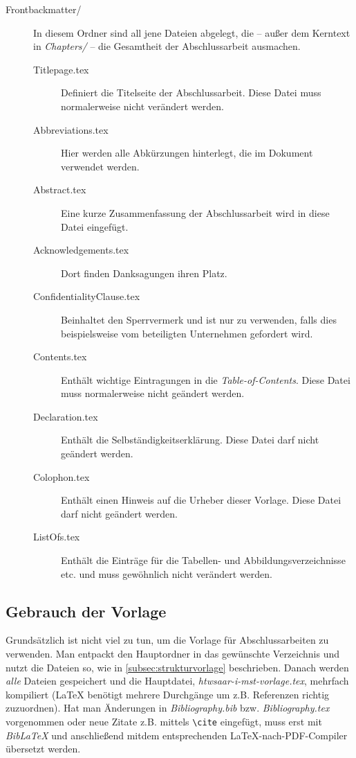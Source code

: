 \begin{description}
	\item [Frontbackmatter/]
	In diesem Ordner sind all jene Dateien abgelegt, die -- außer dem Kerntext in \textit{Chapters/} -- die Gesamtheit der Abschlussarbeit ausmachen.
	\begin{description}
		\item [Titlepage.tex] Definiert die Titelseite der Abschlussarbeit. Diese Datei muss normalerweise nicht verändert werden.
		\item [Abbreviations.tex] Hier werden alle Abkürzungen hinterlegt, die im Dokument verwendet werden.
		\item [Abstract.tex] Eine kurze Zusammenfassung der Abschlussarbeit wird in diese Datei eingefügt.
		\item [Acknowledgements.tex] Dort finden Danksagungen ihren Platz.
		\item [ConfidentialityClause.tex] Beinhaltet den Sperrvermerk und ist nur zu verwenden, falls dies beispielsweise vom beteiligten Unternehmen gefordert wird.
		\item [Contents.tex] Enthält wichtige Eintragungen in die \textit{Table-of-Contents}. Diese Datei muss normalerweise nicht geändert werden.
		\item [Declaration.tex] Enthält die Selbständigkeitserklärung. Diese Datei darf nicht geändert werden.
		\item [Colophon.tex] Enthält einen Hinweis auf die Urheber dieser Vorlage. Diese Datei darf nicht geändert werden.
		\item [ListOfs.tex] Enthält die Einträge für die Tabellen- und Abbildungsverzeichnisse etc. und muss gewöhnlich nicht verändert werden.
	\end{description}
	
\end{description}


\subsection{Gebrauch der Vorlage}

Grundsätzlich ist nicht viel zu tun, um die Vorlage für Abschlussarbeiten zu verwenden. Man entpackt den Hauptordner in das gewünschte Verzeichnis und nutzt die Dateien so, wie in
\autoref{subsec:strukturvorlage} beschrieben. Danach werden \textit{alle} Dateien gespeichert und die Hauptdatei, \textit{htwsaar-i-mst-vorlage.tex}, mehrfach kompiliert
(LaTeX benötigt mehrere Durchgänge um z.B. Referenzen richtig zuzuordnen).
Hat man Änderungen in \textit{Bibliography.bib} bzw. \textit{Bibliography.tex} vorgenommen oder neue Zitate z.B. mittels \lstinline{\cite} eingefügt, muss erst mit 
\textit{BibLaTeX} und anschließend mitdem entsprechenden LaTeX-nach-PDF-Compiler übersetzt werden.


